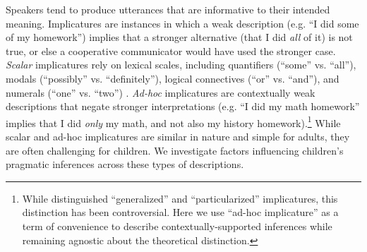 \documentclass[10pt,letterpaper]{article}
\begin{document}
Speakers tend to produce utterances that are informative to their intended meaning. Implicatures are instances in which a weak description (e.g. ``I did some of my homework'') implies that a stronger alternative (that I did \emph{all} of it) is not true, or else a cooperative communicator would have used the stronger case. \emph{Scalar} implicatures rely on lexical scales, including quantifiers (``some'' vs. ``all''), modals (``possibly'' vs. ``definitely''), logical connectives (``or'' vs. ``and''), and numerals (``one'' vs. ``two'') \cite{horn1972}. \emph{Ad-hoc} implicatures are contextually weak descriptions that negate stronger interpretations (e.g. ``I did my math homework'' implies that I did \emph{only} my math, and not also my history homework).\footnote{While  distinguished ``generalized'' and ``particularized'' implicatures, this distinction has been controversial. Here we use ``ad-hoc implicature'' as a term of convenience to describe contextually-supported inferences while remaining agnostic about the theoretical distinction.}   While scalar and ad-hoc implicatures are similar in nature and simple for adults, they are often challenging for children. We investigate factors influencing children's pragmatic inferences across these types of descriptions.

\end{document}
